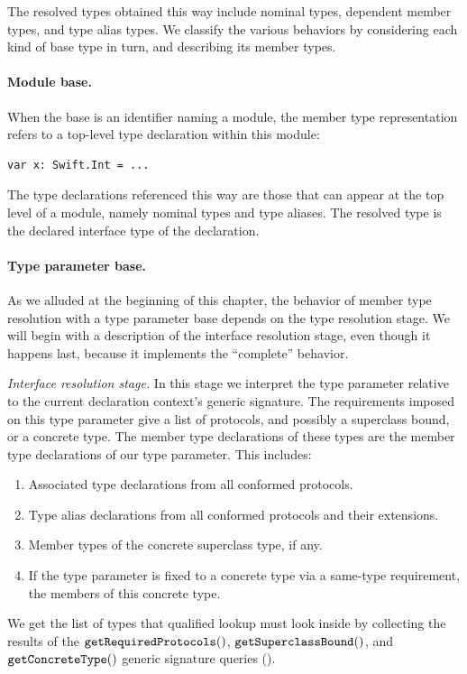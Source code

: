 \documentclass[../generics]{subfiles}
\begin{document}
The resolved types obtained this way include nominal types, dependent member types, and type alias types. We classify the various behaviors by considering each kind of base type in turn, and describing its member types.

\paragraph{Module base.}
When the base is an identifier naming a module, the member type representation refers to a top-level type declaration within this module:
\begin{Verbatim}
var x: Swift.Int = ...
\end{Verbatim}
The type declarations referenced this way are those that can appear at the top level of a module, namely nominal types and type aliases. The resolved type is the declared interface type of the declaration.

\paragraph{Type parameter base.}
As we alluded at the beginning of this chapter, the behavior of member type resolution with a type parameter base depends on the type resolution stage. We will begin with a description of the interface resolution stage, even though it happens last, because it implements the ``complete'' behavior.

\smallskip

\emph{Interface resolution stage.} In this stage we interpret the type parameter relative to the current declaration context's generic signature. The requirements imposed on this type parameter give a list of protocols, and possibly a superclass bound, or a concrete type. The member type declarations of these types are the member type declarations of our type parameter. This includes:
\label{label:type parameter base}
\begin{enumerate}
\item Associated type declarations from all conformed protocols.
\item Type alias declarations from all conformed protocols and their extensions.
\item Member types of the concrete superclass type, if any.
\item If the type parameter is fixed to a concrete type via a same-type requirement, the members of this concrete type.
\end{enumerate}
We get the list of types that qualified lookup must look inside by collecting the results of the $\texttt{getRequiredProtocols}()$, $\texttt{getSuperclassBound}()$, and $\texttt{getConcreteType}()$ generic signature queries ().
\end{document}
